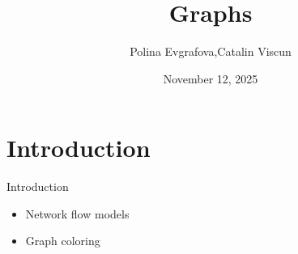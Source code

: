 \documentclass[10pt]{beamer}
\begin{document}
\title{Graphs}
\author{Polina Evgrafova,Catalin Viscun}
\date{November 12, 2025}

\begin{frame}
    \maketitle
\end{frame}


\section{Introduction}
\begin{frame}{Introduction}
  \begin{itemize}
    \item Network flow models
    \item Graph coloring
  \end{itemize}
\end{frame}
\end{document}
